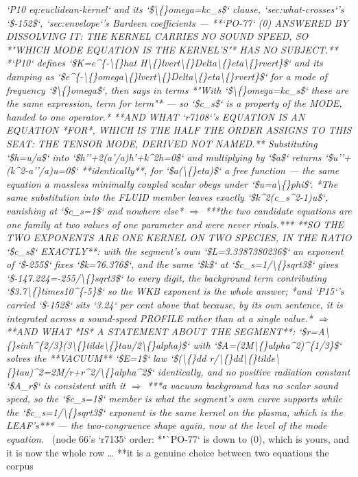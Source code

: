 \begin{description}
\textit{`P10 eq:euclidean-kernel` and its `\$\textbackslash\{\}omega=kc\_s\$` clause, `sec:what-crosses`'s `\$-152\$`, `sec:envelope`'s Bardeen coefficients ---  **`PO-77` (0) ANSWERED BY DISSOLVING IT: THE KERNEL CARRIES NO SOUND SPEED, SO *"WHICH MODE EQUATION IS THE KERNEL'S"* HAS NO SUBJECT.** *`P10` defines `\$K=e\textasciicircum{}\{-\textbackslash\{\}hat H\textbackslash\{\}lvert\textbackslash\{\}Delta\textbackslash\{\}eta\textbackslash\{\}rvert\}\$` and its damping as `\$e\textasciicircum{}\{-\textbackslash\{\}omega\textbackslash\{\}lvert\textbackslash\{\}Delta\textbackslash\{\}eta\textbackslash\{\}rvert\}\$` for a mode of frequency `\$\textbackslash\{\}omega\$`, then says in terms *"With `\$\textbackslash\{\}omega=kc\_s\$` these are the same expression, term for term"* --- so `\$c\_s\$` is a property of the MODE, handed to one operator.*  **AND WHAT `r7108`'s EQUATION IS AN EQUATION *FOR*, WHICH IS THE HALF THE ORDER ASSIGNS TO THIS SEAT: THE TENSOR MODE, DERIVED NOT NAMED.** Substituting `\$h=u/a\$` into `\$h''+2(a'/a)h'+k\textasciicircum{}2h=0\$` and multiplying by `\$a\$` returns `\$u''+(k\textasciicircum{}2-a''/a)u=0\$` **identically**, for `\$a(\textbackslash\{\}eta)\$` a free function --- the same equation a massless minimally coupled scalar obeys under `\$u=a\textbackslash\{\}phi\$`.  *The same substitution into the FLUID member leaves exactly `\$k\textasciicircum{}2(c\_s\textasciicircum{}2-1)u\$`, vanishing at `\$c\_s=1\$` and nowhere else* \ensuremath{\Rightarrow} ***the two candidate equations are one family at two values of one parameter and were never rivals.***  **SO THE TWO EXPONENTS ARE ONE KERNEL ON TWO SPECIES, IN THE RATIO `\$c\_s\$` EXACTLY**: with the segment's own `\$L=3.3387380236\$` an exponent of `\$-255\$` fixes `\$k=76.376\$`, and the same `\$k\$` at `\$c\_s=1/\textbackslash\{\}sqrt3\$` gives `\$-147.224=-255/\textbackslash\{\}sqrt3\$` to every digit, the background term contributing `\$3.7\textbackslash\{\}times10\textasciicircum{}\{-5\}\$` so the WKB exponent is the whole answer; *and `P15`'s carried `\$-152\$` sits `3.24` per cent above that because, by its own sentence, it is integrated across a sound-speed PROFILE rather than at a single value.* \ensuremath{\Rightarrow}  **AND WHAT *IS* A STATEMENT ABOUT THE SEGMENT**: `\$r=A\textbackslash\{\}sinh\textasciicircum{}\{2/3\}(3\textbackslash\{\}tilde\textbackslash\{\}tau/2\textbackslash\{\}alpha)\$` with `\$A=(2M\textbackslash\{\}alpha\textasciicircum{}2)\textasciicircum{}\{1/3\}\$` solves the **VACUUM** `\$E=1\$` law `\$(\textbackslash\{\}dd r/\textbackslash\{\}dd\textbackslash\{\}tilde\textbackslash\{\}tau)\textasciicircum{}2=2M/r+r\textasciicircum{}2/\textbackslash\{\}alpha\textasciicircum{}2\$` identically, and no positive radiation constant `\$A\_r\$` is consistent with it \ensuremath{\Rightarrow} ***a vacuum background has no scalar sound speed, so the `\$c\_s=1\$` member is what the segment's own curve supports while the `\$c\_s=1/\textbackslash\{\}sqrt3\$` exponent is the same kernel on the plasma, which is the LEAF's*** --- the two-congruence shape again, now at the level of the mode equation.} \ (node 66's `r7135` order: *"`PO-77` is down to (0), which is yours, and it is now the whole row \ldots{} **it is a genuine choice between two equations the corpus 
\end{description}

